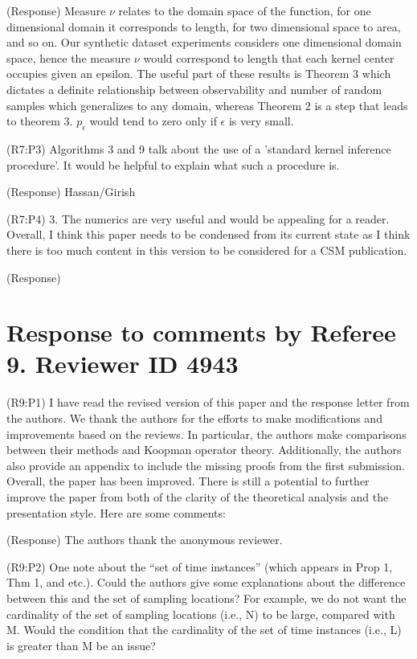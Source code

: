 \documentclass{letter}
\begin{document}
{\color{red}(Response)} Measure $ \nu $ relates to the domain space of the function, for one dimensional domain it corresponds to length, for two dimensional space to area, and so on. Our synthetic dataset experiments considers one dimensional domain space, hence the measure $ \nu $ would correspond to length that each kernel center occupies given an epsilon. The useful part of these results is Theorem 3 which dictates a definite relationship between observability and number of random samples which generalizes to any domain, whereas Theorem 2 is a step that leads to theorem 3. $p_\epsilon$ would tend to zero only if $ \epsilon $ is very small.

{\color{red}(R7:P3)} Algorithms 3 and 9 talk about the use of a 'standard kernel inference procedure'. It would be helpful to explain what such a procedure is.

{\color{red}(Response)} Hassan/Girish

{\color{red}(R7:P4)} 3. The numerics are very useful and would be appealing for a reader. Overall, I think this paper needs to be condensed from its current
state as I think there is too much content in this version to be considered for a CSM publication.

{\color{red}(Response)} 



\section{Response to comments by Referee 9. Reviewer ID 4943}

{\color{red}(R9:P1)} I have read the revised version of this paper and the response letter from the authors. We thank the authors for the efforts to make modifications and improvements based on the reviews. In particular, the authors make comparisons between their methods and Koopman operator theory. Additionally, the authors also provide an appendix to include the missing proofs from the first submission. Overall, the paper has been improved. There is still a potential to further improve the paper from both of the clarity of the theoretical analysis and the presentation style. Here are some comments:  

{\color{red}(Response)} The authors thank the anonymous reviewer.

{\color{red}(R9:P2)} One note about the “set of time instances” (which appears in Prop 1, Thm 1, and etc.). Could the authors give some explanations about the difference between this and the set of sampling locations? For example, we do not want the cardinality of the set of sampling locations (i.e., N) to be large, compared with M. Would the condition that the cardinality of the set of time instances (i.e., L) is greater than M be an issue?
\end{document}
